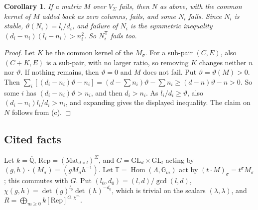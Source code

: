 \documentclass[11pt,a4paper]{article}
\theoremstyle{plain}
\newtheorem{corollary}{Corollary}
\theoremstyle{definition}
\newcommand{\Qbar}{\overline{\mathbb{Q}}}
\newcommand{\Tor}{\mathbb{T}}
\newcommand{\Gm}{\mathbb{G}_{m}}
\newcommand{\Rep}{\mathrm{Rep}}
\newcommand{\GL}{\mathrm{GL}}
\newcommand{\vth}{\vartheta}
\newcommand{\Hom}{\operatorname{Hom}}
\begin{document}
\begin{corollary}\label{cor:reduction}
If a matrix $M$ over $V_{\Sigma}$ fails, then $N$ as above, with the common kernel of $M$ added back as zero columns, fails, and some $N_{i}$ fails.
Since $N_{i}$ is stable, $\vth(N_{i})=l_{i}/d_{i}$, and failure of $N_{i}$ is the symmetric inequality
$(d_{i}-n_{i})(l_{i}-n_{i})>n_{i}^{2}$. So $N_{i}^{\mathsf T}$ fails too.
\end{corollary}

\begin{proof}
Let $K$ be the common kernel of the $M_{\sigma}$. For a sub-pair $(C,E)$, also $(C+K,E)$ is a sub-pair, with no larger ratio, so removing $K$ changes
neither $n$ nor $\vth$. If nothing remains, then $\vth=0$ and $M$ does not fail. Put $\vth=\vth(M)>0$. Then
$\sum_{i}[(d_{i}-n_{i})\vth-n_{i}]=(d-\sum n_{i})\vth-\sum n_{i}\ge(d-n)\vth-n>0$. So some $i$ has $(d_{i}-n_{i})\vth>n_{i}$, and then $d_{i}>n_{i}$.
As $l_{i}/d_{i}\ge\vth$, also $(d_{i}-n_{i})l_{i}/d_{i}>n_{i}$, and expanding gives the displayed inequality. The claim on $N$ follows from (c).
\end{proof}

\subsection{Cited facts}\label{sec:cited}

Let $k=\Qbar$, $\Rep=(\mathrm{Mat}_{d\times l})^{\Sigma}$, and $G=\GL_{d}\times\GL_{l}$ acting by $(g,h)\cdot(M_{\sigma})=(gM_{\sigma}h^{-1})$. Let $\Tor=\Hom(\Lambda,\Gm)$
act by $(t\cdot M)_{\sigma}=t^{\sigma}M_{\sigma}$; this commutes with $G$. Put $(l_{0},d_{0})=(l,d)/\gcd(l,d)$, $\chi(g,h)=\det(g)^{l_{0}}\det(h)^{-d_{0}}$, which is trivial on the
scalars $(\lambda,\lambda)$, and $R=\bigoplus_{m\ge0}k[\Rep]^{G,\chi^{m}}$.
\end{document}
